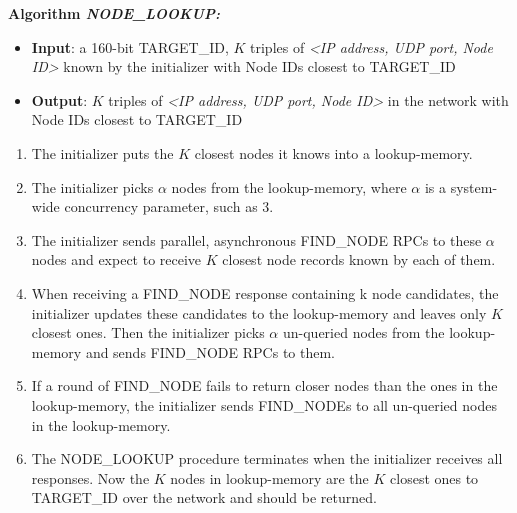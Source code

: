 \noindent \textbf{Algorithm \textit{NODE\_LOOKUP:}}
\begin{itemize}
  \item \textbf{Input}: a 160-bit TARGET\_ID, $K$ triples of \textit{<IP address, UDP port, Node ID>} known by the initializer with Node IDs closest to TARGET\_ID
  \item \textbf{Output}: $K$ triples of \textit{<IP address, UDP port, Node ID>} in the network with Node IDs closest to TARGET\_ID
\end{itemize}
\begin{enumerate}[label=(\roman*)]
  \item The initializer puts the $K$ closest nodes it knows into a lookup-memory.
  \item The initializer picks $\alpha$ nodes from the lookup-memory, where $\alpha$ is a system-wide concurrency parameter, such as 3.
  \item The initializer sends parallel, asynchronous FIND\_NODE RPCs to these $\alpha$ nodes and expect to receive $K$ closest node records known by each of them.
  \item When receiving a FIND\_NODE response containing k node candidates, the initializer updates these candidates to the lookup-memory and leaves only $K$ closest ones. Then the initializer picks $\alpha$ un-queried nodes from the lookup-memory and sends FIND\_NODE RPCs to them.
  \item If a round of FIND\_NODE fails to return closer nodes than the ones in the lookup-memory, the initializer sends FIND\_NODEs to all un-queried nodes in the lookup-memory.
  \item The NODE\_LOOKUP procedure terminates when the initializer receives all responses. Now the $K$ nodes in lookup-memory are the $K$ closest ones to TARGET\_ID over the network and should be returned.
\end{enumerate}

